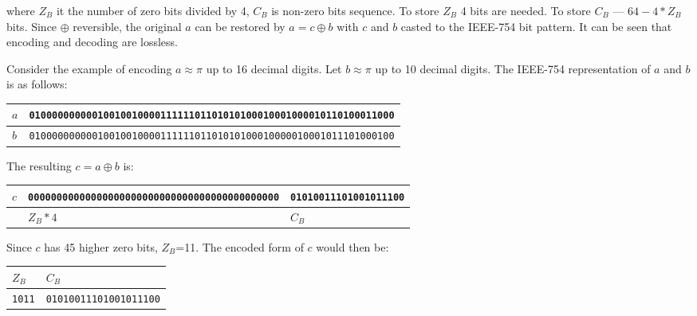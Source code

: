 \documentclass[lettersize,journal]{IEEEtran}
\begin{document}
\noindent where \(Z_B\) it the number of zero bits divided by 4, \(C_B\) is non-zero bits sequence.
To store \(Z_B\) 4 bits are needed. To store \(C_B\) --- \(64 - 4*Z_B\) bits. 
Since \(\oplus\) reversible, the original \(a\) can be restored by \(a = c \oplus b\) with \(c\)
and \(b\) casted to the IEEE-754 bit pattern. It can be seen that encoding and decoding are lossless.

Consider the example of encoding \(a \approx \pi\) up to 16 decimal digits. Let \(b\approx \pi\) 
up to 10 decimal digits. The IEEE-754 representation of \(a\) and \(b\) is as follows:

\begin{table}[!h]
	\centering
	\fontsize{5.5}{1.2} {
	\begin{tabularx}{\columnwidth}{ 
			| >{\raggedleft\arraybackslash}l 
			| >{\raggedright\arraybackslash}X |}
		\hline
		 \(a\) & \texttt{0100000000001001001000011111101101010100010001000010110100011000} \\
		\hline
		\(b\) & \texttt{0100000000001001001000011111101101010100010000010001011101000100} \\
		\hline
	\end{tabularx}
}
\end{table}

The resulting \(c=a \oplus b\) is:

\begin{table}[!h]
	\centering
	\fontsize{5.5}{1.2} {
		\begin{tabularx}{\columnwidth}{ 
				| >{\raggedleft\arraybackslash}l 
				| >{\raggedright\arraybackslash}l 
 			    | >{\raggedright\arraybackslash}X |}
			\hline
			\(c\) & \texttt{00000000000000000000000000000000000000000000} & \texttt{01010011101001011100} \\
			\hline
		    & \multicolumn{1}{c|} {\(Z_B * 4\)} & \multicolumn{1}{c|} {\(C_B\)} \\ 
			\hline
		\end{tabularx}
	}
\end{table}

Since \(c\) has 45 higher zero bits, \(Z_B\)=11. The encoded form of \(c\) would then be:

\begin{table}[!h]
	\centering
	\fontsize{5.5}{1.2} {
		\begin{tabularx}{0.4\columnwidth}{ 
				| >{\raggedright\arraybackslash}l 
				| >{\raggedright\arraybackslash}X |}
			\hline
			\multicolumn{1}{|c|} {\(Z_B\)} & \multicolumn{1}{c|} {\(C_B\)} \\ 
			\hline
			\texttt{1011} & \texttt{01010011101001011100} \\
			\hline
		\end{tabularx}
	}
\end{table}
\end{document}

